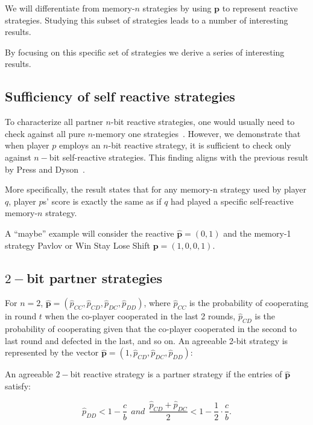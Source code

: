 \documentclass{article}
\theoremstyle{definition}
\begin{document}
We will differentiate from memory-$n$ strategies by using $\mathbf{p}$ to
represent reactive strategies. Studying this subset of strategies leads to a
number of interesting results.

By focusing on this specific set of strategies we derive a series of interesting
results.

\subsection{Sufficiency of self reactive strategies}

To characterize all partner $n$-bit reactive strategies, one would usually
need to check against all pure $n$-memory one strategies~\cite{mcavoy:PRSA:2019}.
However, we demonstrate that when player $p$ employs an $n$-bit reactive strategy,
it is sufficient to check only against $n-$bit self-reactive strategies. This
finding aligns with the previous result by Press and Dyson~\cite{press:PNAS:2012}.

More specifically, the result states that for any memory-n strategy used by
player $q$, player $p$s' score is exactly the same as if $q$ had played a
specific self-reactive memory-$n$ strategy.

A ``maybe'' example will consider the reactive $\mathbf{\hat{p}} = (0, 1)$ and the
memory-1 strategy Pavlov or Win Stay Lose Shift $\mathbf{p} = (1, 0, 0, 1)$.

\subsection{$2-$bit partner strategies}

For $n=2$, $\mathbf{\hat{p}}=(\hat{p}_{CC}, \hat{p}_{CD}, \hat{p}_{DC}, \hat{p}_{DD})$, where
$\hat{p}_{CC}$ is the probability of cooperating in round \(t\) when the
co-player cooperated in the last 2 rounds, $\hat{p}_{CD}$ is the probability of
cooperating given that the co-player cooperated in the second to last round and
defected in the last, and so on. An agreeable 2-bit strategy is represented by
the vector $\mathbf{\hat{p}}=(1, \hat{p}_{CD}, \hat{p}_{DC}, \hat{p}_{DD})$:

An agreeable $2-$bit reactive strategy is a partner strategy if the entries of
$\mathbf{\hat{p}}$ satisfy:

\begin{equation}\label{eq:two_bit_conditions}
  \displaystyle \hat{p}_{DD} < 1\!-\! \frac{c}{b}  ~~and~~ \displaystyle \frac{\hat{p}_{CD} + \hat{p}_{DC}}{2} < 1- \frac{1}{2} \cdot \frac{c}{b}.
\end{equation}
\end{document}
